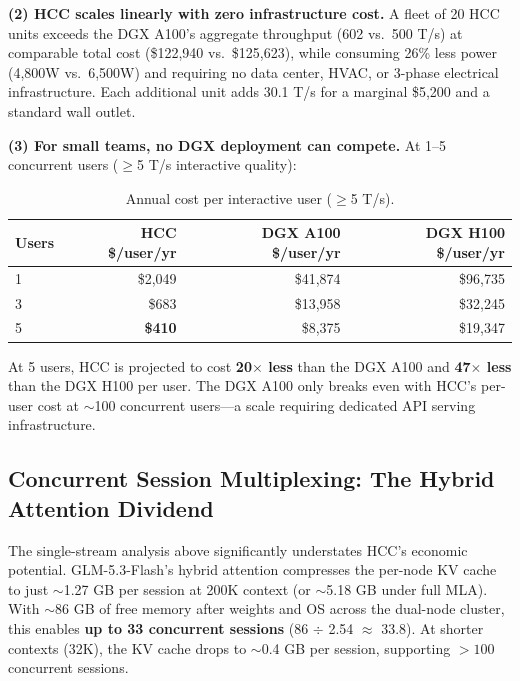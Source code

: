 \documentclass[11pt,a4paper]{article}
\begin{document}
\textbf{(2) HCC scales linearly with zero infrastructure cost.} A fleet of 20 HCC units exceeds the DGX A100's aggregate throughput (602 vs.\ 500 T/s) at comparable total cost (\$122,940 vs.\ \$125,623), while consuming 26\% less power (4,800W vs.\ 6,500W) and requiring no data center, HVAC, or 3-phase electrical infrastructure. Each additional unit adds 30.1 T/s for a marginal \$5,200 and a standard wall outlet.

\textbf{(3) For small teams, no DGX deployment can compete.} At 1--5 concurrent users ($\geq$5 T/s interactive quality):

\begin{table}[ht!]
\centering
\caption{Annual cost per interactive user ($\geq$5 T/s).}
\vspace{0.2cm}
\begin{tabular}{l r r r}
\toprule
\textbf{Users} & \textbf{HCC \$/user/yr} & \textbf{DGX A100 \$/user/yr} & \textbf{DGX H100 \$/user/yr} \\
\midrule
1 & \$2,049 & \$41,874 & \$96,735 \\
3 & \$683 & \$13,958 & \$32,245 \\
5 & \textbf{\$410} & \$8,375 & \$19,347 \\
\bottomrule
\end{tabular}
\label{tab:cost_per_user}
\end{table}

\noindent At 5 users, HCC is projected to cost \textbf{20$\times$ less} than the DGX A100 and \textbf{47$\times$ less} than the DGX H100 per user. The DGX A100 only breaks even with HCC's per-user cost at $\sim$100 concurrent users---a scale requiring dedicated API serving infrastructure.

\subsection{Concurrent Session Multiplexing: The Hybrid Attention Dividend}

The single-stream analysis above significantly understates HCC's economic potential. GLM-5.3-Flash's hybrid attention compresses the per-node KV cache to just $\sim$1.27 GB per session at 200K context (or $\sim$5.18 GB under full MLA). With $\sim$86 GB of free memory after weights and OS across the dual-node cluster, this enables \textbf{up to 33 concurrent sessions} (86 $\div$ 2.54 $\approx$ 33.8). At shorter contexts (32K), the KV cache drops to $\sim$0.4 GB per session, supporting $>100$ concurrent sessions.
\end{document}
